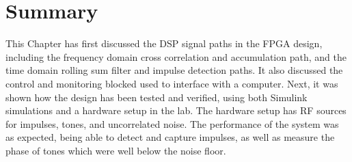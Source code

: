 \section{Summary}
This Chapter has first discussed the DSP signal paths in the FPGA design, including the frequency domain cross correlation and accumulation path, and the time domain rolling sum filter and impulse detection paths. It also discussed the control and monitoring blocked used to interface with a computer. Next, it was shown how the design has been tested and verified, using both Simulink simulations and a hardware setup in the lab. The hardware setup has RF sources for impulses, tones, and uncorrelated noise. The performance of the system was as expected, being able to detect and capture impulses, as well as measure the phase of tones which were well below the noise floor.
